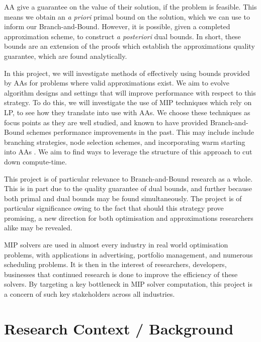 \documentclass[12pt, a4paper]{article}
\begin{document}
AA give a guarantee on the value of their solution, if the problem is feasible. This means we obtain an \emph{a priori} primal bound on the solution, which we can use to inform our Branch-and-Bound. However, it is possible, given a completed approximation scheme, to construct \emph{a posteriori} dual bounds. In short, these bounds are an extension of the proofs which establish the approximations quality guarantee, which are found analytically. 

In this project, we will investigate methods of effectively using bounds provided by AAs for problems where valid approximations exist. We aim to evolve algorithm designs and settings that will improve performance with respect to this strategy. To do this, we will investigate the use of MIP techniques which rely on LP, to see how they translate into use with AAs. We choose these techniques as focus points as they are well studied, and known to have provided Branch-and-Bound schemes performance improvements in the past. This may include include branching strategies, node selection schemes, and incorporating warm starting into AAs \cite{Ralphs}. We aim to find ways to leverage the structure of this approach to cut down compute-time.

This project is of particular relevance to Branch-and-Bound research as a whole. This is in part due to the quality guarantee of dual bounds, and further because both primal and dual bounds may be found simultaneously. The project is of particular significance owing to the fact that should this strategy prove promising, a new direction for both optimisation and approximations researchers alike may be revealed. 

MIP solvers are used in almost every industry in real world optimisation problems, with applications in advertising, portfolio management, and numerous scheduling problems. It is then in the interest of researchers, developers, businesses that continued research is done to improve the efficiency of these solvers. By targeting a key bottleneck in MIP solver computation, this project is a concern of such key stakeholders across all industries. 

\section{Research Context / Background}
\end{document}
